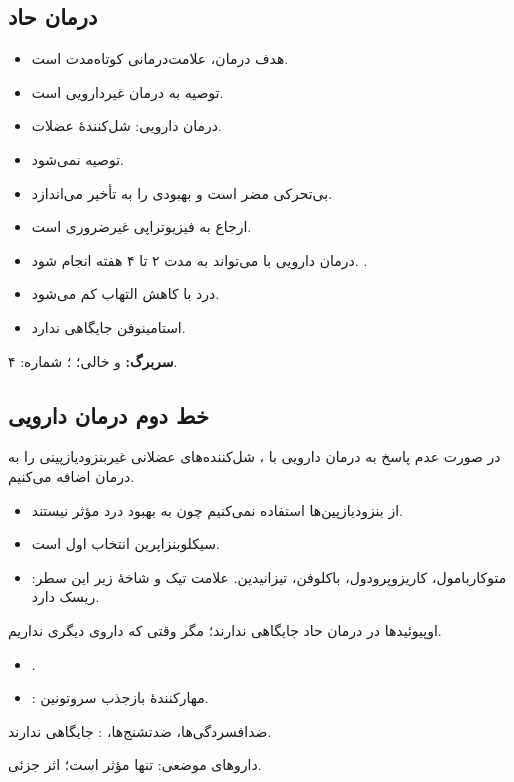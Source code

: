 \documentclass[12pt,a4paper]{article}
\begin{document}
\subsection*{درمان  حاد}
\begin{itemize}
  \item هدف درمان، علامت‌درمانی کوتاه‌مدت است.
  \item توصیه به درمان غیردارویی است.
  \item درمان دارویی:  \LBPm{\pm} شل‌کنندهٔ عضلات.
  \item {} توصیه نمی‌شود.
  \item بی‌تحرکی مضر است و بهبودی را به تأخیر می‌اندازد.
  \item ارجاع به فیزیوتراپی غیرضروری است.
  \item درمان دارویی با  می‌تواند به مدت ۲ تا ۴ هفته انجام شود.
  .
  \item درد با کاهش التهاب کم می‌شود.
  \item استامینوفن جایگاهی ندارد.
\end{itemize}

\textbf{سربرگ:}  و  خالی؛ ؛ شماره: ۴.
\subsection*{خط دوم درمان دارویی}
در صورت عدم پاسخ به درمان دارویی با ، شل‌کننده‌های عضلانی غیربنزودیازپینی را به درمان اضافه می‌کنیم.
\begin{itemize}
  \item از بنزودیازپین‌ها استفاده نمی‌کنیم چون به بهبود درد مؤثر نیستند.
  \item سیکلوبنزاپرین انتخاب اول است.
  \item متوکاربامول، کاریزوپرودول، باکلوفن، تیزانیدین.
  علامت تیک و شاخهٔ زیر این سطر: ریسک  دارد.
\end{itemize}
اوپیوئیدها در درمان  حاد جایگاهی ندارند؛ مگر وقتی که داروی دیگری نداریم.
\begin{itemize}
  \item {}.
  \item {}: مهارکنندهٔ بازجذب سروتونین.
\end{itemize}
ضدافسردگی‌ها، ضدتشنج‌ها، : جایگاهی ندارند.

داروهای موضعی: تنها  مؤثر است؛ اثر جزئی.
\end{document}
